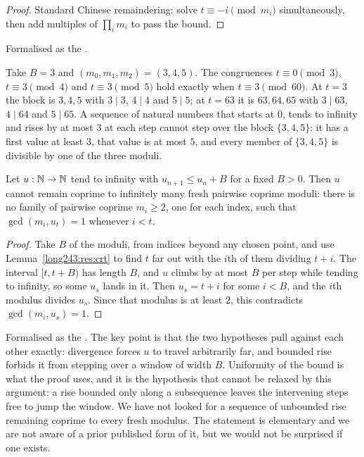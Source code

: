 \documentclass[11pt]{article}
\begin{document}
\begin{proof}
Standard Chinese remaindering: solve $t\equiv-i \pmod{m_i}$ simultaneously,
then add multiples of $\prod_i m_i$ to pass the bound.
\end{proof}

\noindent Formalised as the
.

\begin{example}\label{long243:ex:crt}
Take $B=3$ and $(m_0,m_1,m_2)=(3,4,5)$.  The congruences $t\equiv0\pmod3$,
$t\equiv3\pmod4$ and $t\equiv3\pmod5$ hold exactly when $t\equiv3\pmod{60}$.
At $t=3$ the block is $3,4,5$ with $3\mid3$, $4\mid4$ and $5\mid5$; at $t=63$
it is $63,64,65$ with $3\mid63$, $4\mid64$ and $5\mid65$.  A sequence of
natural numbers that starts at $0$, tends to infinity and rises by at most $3$
at each step cannot step over the block $\{3,4,5\}$: it has a first value at
least $3$, that value is at most $5$, and every member of $\{3,4,5\}$ is
divisible by one of the three moduli.
\end{example}

\begin{theorem}\label{long243:res:barrier}
Let $u:\mathbb{N}\to\mathbb{N}$ tend to infinity with $u_{n+1}\le u_n+B$ for a fixed $B>0$.
Then $u$ cannot remain coprime to infinitely many fresh pairwise coprime
moduli: there is no family of pairwise coprime $m_i\ge2$, one for each index,
such that $\gcd(m_i,u_t)=1$ whenever $i<t$.
\end{theorem}

\begin{proof}
Take $B$ of the moduli, from indices beyond any chosen point, and use
Lemma~\ref{long243:res:crt} to find $t$ far out with the $i$th of them dividing $t+i$.
The interval $[t,t+B)$ has length $B$, and $u$ climbs by at most $B$ per step
while tending to infinity, so some $u_s$ lands in it.  Then $u_s=t+i$ for some
$i<B$, and the $i$th modulus divides $u_s$.  Since that modulus is at least
$2$, this contradicts $\gcd(m_i,u_s)=1$.
\end{proof}

\noindent Formalised as the
.  The key point is that the two hypotheses pull against each other
exactly: divergence forces $u$ to travel arbitrarily far, and bounded rise
forbids it from stepping over a window of width $B$.  Uniformity of the bound
is what the proof uses, and it is the hypothesis that cannot be relaxed by this
argument: a rise bounded only along a subsequence leaves the intervening steps
free to jump the window.  We have not looked for a sequence of unbounded rise
remaining coprime to every fresh modulus.  The statement is elementary and we are not aware of a
prior published form of it, but we would not be surprised if one exists.
\end{document}
